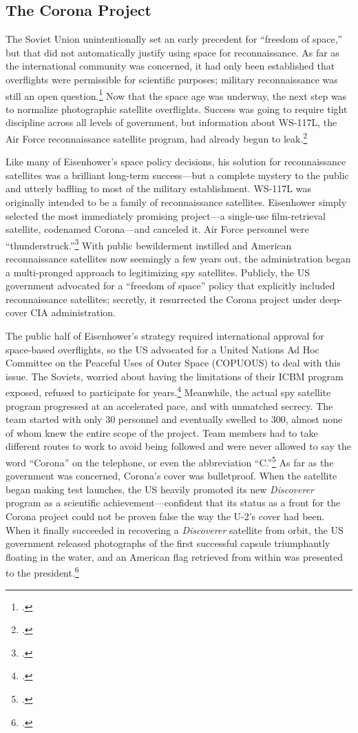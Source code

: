 \documentclass[14pt]{extarticle}
\begin{document}
\subsection{The Corona Project}
The Soviet Union unintentionally set an early precedent for ``freedom of space,'' but that did not automatically justify using space for reconnaissance. As far as the international community was concerned, it had only been established that overflights were permissible for scientific purposes; military reconnaissance was still an open question.\footcite[p.~47-48]{peebles_corona_1997} Now that the space age was underway, the next step was to normalize photographic satellite overflights. Success was going to require tight discipline across all levels of government, but information about WS-117L, the Air Force reconnaissance satellite program, had already begun to leak.\footcite[p.~96]{lindgren_trust_2000}

Like many of Eisenhower's space policy decisions, his solution for reconnaissance satellites was a brilliant long-term success---but a complete mystery to the public and utterly baffling to most of the military establishment. WS-117L was originally intended to be a family of reconnaissance satellites. Eisenhower simply selected the most immediately promising project---a single-use film-retrieval satellite, codenamed Corona---and canceled it. Air Force personnel were ``thunderstruck.''\footcite[p.~45]{peebles_corona_1997} With public bewilderment instilled and American reconnaissance satellites now seemingly a few years out, the administration began a multi-pronged approach to legitimizing spy satellites. Publicly, the US government advocated for a ``freedom of space'' policy that explicitly included reconnaissance satellites; secretly, it resurrected the Corona project under deep-cover CIA administration.

The public half of Eisenhower's strategy required international approval for space-based overflights, so the US advocated for a United Nations Ad Hoc Committee on the Peaceful Uses of Outer Space (COPUOUS) to deal with this issue. The Soviets, worried about having the limitations of their ICBM program exposed, refused to participate for years.\footcite[p.~140]{day_eye_2015} Meanwhile, the actual spy satellite program progressed at an accelerated pace, and with unmatched secrecy. The team started with only 30 personnel and eventually swelled to 300, almost none of whom knew the entire scope of the project. Team members had to take different routes to work to avoid being followed and were never allowed to say the word ``Corona'' on the telephone, or even the abbreviation ``C.''\footcite[p.~51]{peebles_shadow_2000} As far as the government was concerned, Corona's cover was bulletproof. When the satellite began making test launches, the US heavily promoted its new \emph{Discoverer} program as a scientific achievement---confident that its status as a front for the Corona project could not be proven false the way the U-2's cover had been. When it finally succeeded in recovering a \emph{Discoverer} satellite from orbit, the US government released photographs of the first successful capsule triumphantly floating in the water, and an American flag retrieved from within was presented to the president.\footcite[p.~83]{peebles_shadow_2000}
\end{document}
